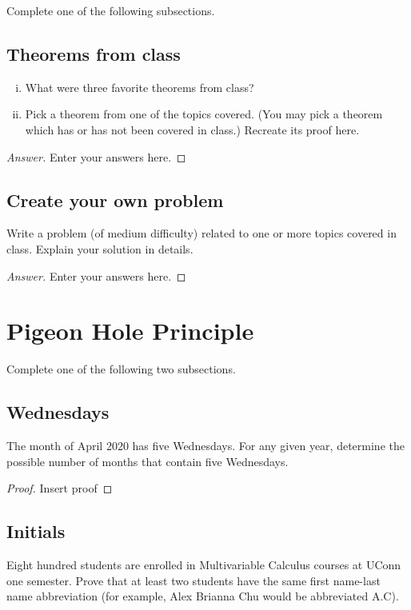 \documentclass[10pt, oneside]{amsart}
\begin{document}
Complete one of the following subsections.

\subsection{Theorems from class}
\begin{enumerate}[i.]
	\item What were three favorite theorems from class?	
	
	\item 
	Pick a theorem from one of the topics covered. (You may pick a theorem which has or has not been covered in class.)
	Recreate its proof here.
	
\end{enumerate}

\begin{proof}[Answer]
	Enter your answers here.
\end{proof}


\subsection{Create your own problem}
Write a problem (of medium difficulty) related to one or more topics covered in class. Explain your solution in details.

\begin{proof}[Answer]
	Enter your answers here.
\end{proof}



\bigskip 


\section{Pigeon Hole Principle}

Complete one of the following two subsections.




\subsection{Wednesdays}


The month of April 2020 has five Wednesdays. For any given year, determine the possible number of months that contain five Wednesdays.


\begin{proof}
	Insert proof
\end{proof}



\subsection{Initials}
Eight hundred students are enrolled in Multivariable Calculus courses at UConn one semester. Prove that at least two students have the same first name-last name abbreviation (for example, Alex Brianna Chu would be abbreviated A.C). 
\end{document}
